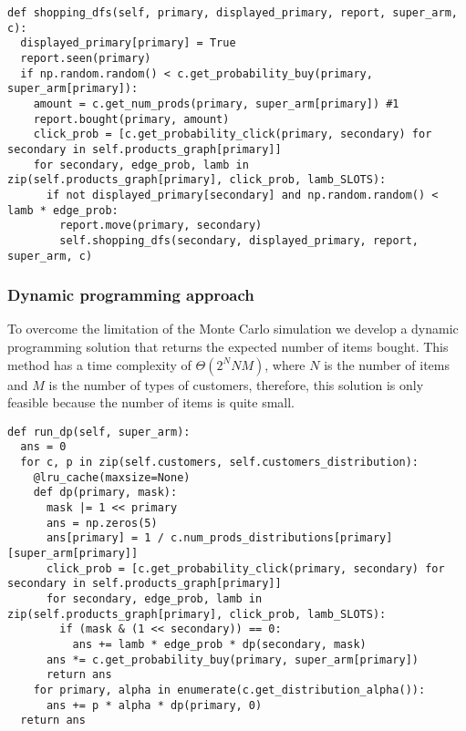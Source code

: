 \begin{verbatim}
def shopping_dfs(self, primary, displayed_primary, report, super_arm, c):
  displayed_primary[primary] = True
  report.seen(primary)
  if np.random.random() < c.get_probability_buy(primary, super_arm[primary]):
    amount = c.get_num_prods(primary, super_arm[primary]) #1
    report.bought(primary, amount)
    click_prob = [c.get_probability_click(primary, secondary) for secondary in self.products_graph[primary]]
    for secondary, edge_prob, lamb in zip(self.products_graph[primary], click_prob, lamb_SLOTS):
      if not displayed_primary[secondary] and np.random.random() < lamb * edge_prob:
        report.move(primary, secondary)
        self.shopping_dfs(secondary, displayed_primary, report, super_arm, c)
\end{verbatim}


\subsubsection{Dynamic programming approach}
To overcome the limitation of the Monte Carlo simulation we develop a dynamic programming solution that returns the expected number of items bought. This method has a time complexity of \(\Theta(2^{N}NM)\), where \(N\) is the number of items and \(M\) is the number of types of customers, therefore, this solution is only feasible because the number of items is quite small.
\begin{verbatim}
def run_dp(self, super_arm):
  ans = 0
  for c, p in zip(self.customers, self.customers_distribution):
    @lru_cache(maxsize=None)
    def dp(primary, mask):
      mask |= 1 << primary
      ans = np.zeros(5)
      ans[primary] = 1 / c.num_prods_distributions[primary][super_arm[primary]]
      click_prob = [c.get_probability_click(primary, secondary) for secondary in self.products_graph[primary]]
      for secondary, edge_prob, lamb in zip(self.products_graph[primary], click_prob, lamb_SLOTS):
        if (mask & (1 << secondary)) == 0:
          ans += lamb * edge_prob * dp(secondary, mask)
      ans *= c.get_probability_buy(primary, super_arm[primary])
      return ans
    for primary, alpha in enumerate(c.get_distribution_alpha()):
      ans += p * alpha * dp(primary, 0)
  return ans
\end{verbatim}
